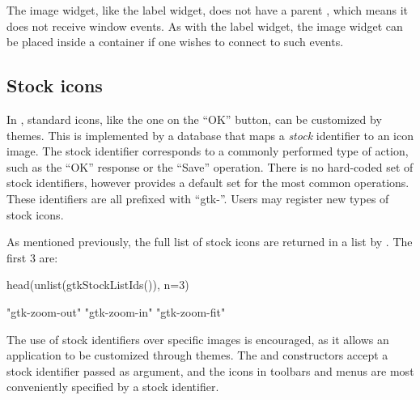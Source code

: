 The image widget, like the label widget, does not have a parent
, which means it does not receive window events. As
with the label widget, the image widget can be placed inside a
 container if one wishes to connect to such
events.

\subsection{Stock icons}
\label{sec:RGtk2:stock-icons}

In \GTK\/, standard icons, like the one on the ``OK'' button, can be
customized by themes. This is implemented by a database that maps a
\textit{stock} identifier to an icon image. The stock identifier
corresponds to a commonly performed type of action, such as the ``OK''
response or the ``Save'' operation. There is no hard-coded set of
stock identifiers, however \GTK\/ provides a default set for the most
common operations. These identifiers are all prefixed with
``gtk-''. Users may register new types of stock icons.

As mentioned previously, the full list of stock icons are returned in
a list by . The first $3$ are:
\begin{Schunk}
\begin{Sinput}
 head(unlist(gtkStockListIds()), n=3)   
\end{Sinput}
\begin{Soutput}
[1] "gtk-zoom-out" "gtk-zoom-in"  "gtk-zoom-fit"
\end{Soutput}
\end{Schunk}

The use of stock identifiers over specific images is encouraged, as it
allows an application to be customized through themes. The
 and  constructors accept
a stock identifier passed as  argument, and the icons in
toolbars and menus are most conveniently specified by a stock
identifier. 




